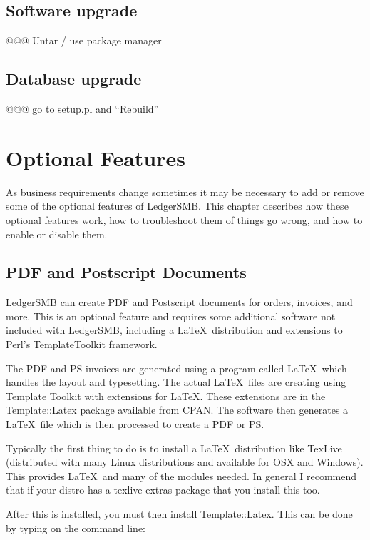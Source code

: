\section{Software upgrade}
\label{sec-updates-software-upgrades}

@@@ Untar / use package manager

\section{Database upgrade}
\label{sec-updates-database-upgrades}

@@@ go to setup.pl and ``Rebuild''

\chapter{Optional Features}
\label{cha-options}

As business requirements change sometimes it may be necessary to add or remove
some of the optional features of LedgerSMB.  This chapter describes how these
optional features work, how to troubleshoot them of things go wrong, and how to
enable or disable them.

\section{PDF and Postscript Documents}
\label{sec-options-pdf}

LedgerSMB can create PDF and Postscript documents for orders, invoices, and
more.  This is an optional feature and requires some additional software not
included with LedgerSMB, including a \LaTeX\ distribution and extensions to 
Perl's TemplateToolkit framework.

The PDF and PS invoices are generated using a program called \LaTeX\
which handles the layout and typesetting.  The actual \LaTeX\ files are
creating using Template Toolkit with extensions for \LaTeX.  These
extensions are in the Template::Latex package available from CPAN.
The software then generates a \LaTeX\ file which is then processed to
create a PDF or PS.

Typically the first thing to do is to install a \LaTeX\ distribution
like TexLive (distributed with many Linux distributions and available
for OSX and Windows).  This provides \LaTeX\ and many of the modules
needed.   In general I recommend that if your distro has a
texlive-extras package that you install this too.

After this is installed, you must then install Template::Latex.  This
can be done by typing on the command line:

